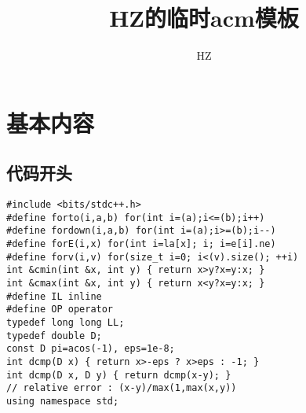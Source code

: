 \documentclass{article}
\begin{document}
\title{HZ的临时acm模板}
\author{HZ}
\maketitle
\tableofcontents

\section{基本内容}

\subsection{代码开头}
\begin{lstlisting}
#include <bits/stdc++.h>
#define forto(i,a,b) for(int i=(a);i<=(b);i++)
#define fordown(i,a,b) for(int i=(a);i>=(b);i--)
#define forE(i,x) for(int i=la[x]; i; i=e[i].ne)
#define forv(i,v) for(size_t i=0; i<(v).size(); ++i)
int &cmin(int &x, int y) { return x>y?x=y:x; }
int &cmax(int &x, int y) { return x<y?x=y:x; }
#define IL inline
#define OP operator
typedef long long LL;
typedef double D;
const D pi=acos(-1), eps=1e-8;
int dcmp(D x) { return x>-eps ? x>eps : -1; }
int dcmp(D x, D y) { return dcmp(x-y); }
// relative error : (x-y)/max(1,max(x,y))
using namespace std;
\end{lstlisting}
\end{document}
